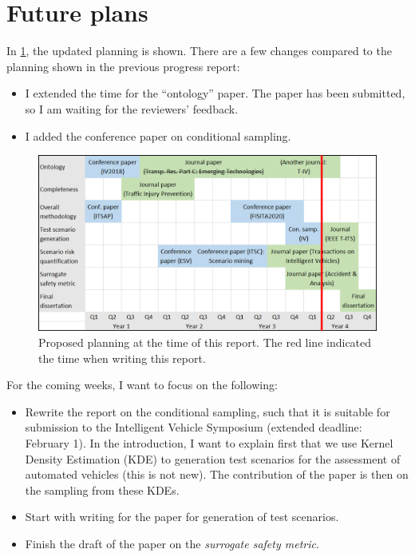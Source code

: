 \documentclass[10pt,final,a4paper,oneside,onecolumn]{article}
\begin{document}
\section{Future plans}

In \cref{fig:planning}, the updated planning is shown. There are a few changes compared to the planning shown in the previous progress report:
\begin{itemize}
	\item I extended the time for the ``ontology'' paper. The paper has been submitted, so I am waiting for the reviewers' feedback.
	\item I added the conference paper on conditional sampling.
\end{itemize}

\begin{figure}[t]
	\centering
	\includegraphics[width=\linewidth]{planning.png}
	\caption{Proposed planning at the time of this report. The red line indicated the time when writing this report.}
	\label{fig:planning}
\end{figure}

For the coming weeks, I want to focus on the following:
\begin{itemize}
	\item Rewrite the report on the conditional sampling, such that it is suitable for submission to the Intelligent Vehicle Symposium (extended deadline: February 1). In the introduction, I want to explain first that we use Kernel Density Estimation (KDE) to generation test scenarios for the assessment of automated vehicles (this is not new). The contribution of the paper is then on the sampling from these KDEs. 
	
	\item Start with writing for the paper for generation of test scenarios.
	
	\item Finish the draft of the paper on the \emph{surrogate safety metric}.
\end{itemize}
\end{document}
